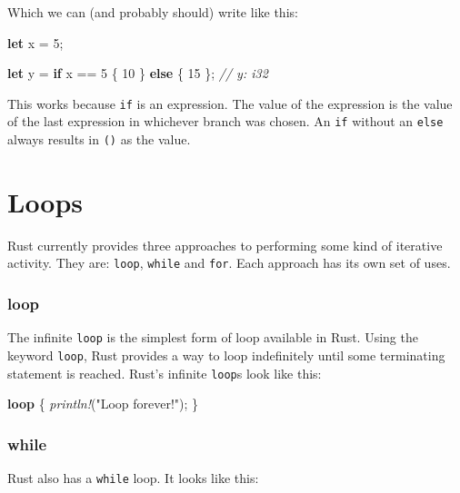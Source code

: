 \documentclass[a4paper,]{book}
\newenvironment{Shaded}{\begin{snugshade}}{\end{snugshade}}
\newcommand{\KeywordTok}[1]{\textcolor[rgb]{0.13,0.29,0.53}{\textbf{{#1}}}}
\newcommand{\DecValTok}[1]{\textcolor[rgb]{0.00,0.00,0.81}{{#1}}}
\newcommand{\StringTok}[1]{\textcolor[rgb]{0.31,0.60,0.02}{{#1}}}
\newcommand{\CommentTok}[1]{\textcolor[rgb]{0.56,0.35,0.01}{\textit{{#1}}}}
\newcommand{\PreprocessorTok}[1]{\textcolor[rgb]{0.56,0.35,0.01}{\textit{{#1}}}}
\newcommand{\NormalTok}[1]{{#1}}
\begin{document}
Which we can (and probably should) write like this:

\begin{Shaded}
\begin{Highlighting}[]
\KeywordTok{let} \NormalTok{x = }\DecValTok{5}\NormalTok{;}

\KeywordTok{let} \NormalTok{y = }\KeywordTok{if} \NormalTok{x == }\DecValTok{5} \NormalTok{\{ }\DecValTok{10} \NormalTok{\} }\KeywordTok{else} \NormalTok{\{ }\DecValTok{15} \NormalTok{\}; }\CommentTok{// y: i32}
\end{Highlighting}
\end{Shaded}

This works because \texttt{if} is an expression. The value of the
expression is the value of the last expression in whichever branch was
chosen. An \texttt{if} without an \texttt{else} always results in
\texttt{()} as the value.

\section{Loops}\label{sec--loops}

Rust currently provides three approaches to performing some kind of
iterative activity. They are: \texttt{loop}, \texttt{while} and
\texttt{for}. Each approach has its own set of uses.

\subsubsection{loop}\label{loop}

The infinite \texttt{loop} is the simplest form of loop available in
Rust. Using the keyword \texttt{loop}, Rust provides a way to loop
indefinitely until some terminating statement is reached. Rust's
infinite \texttt{loop}s look like this:

\begin{Shaded}
\begin{Highlighting}[]
\KeywordTok{loop} \NormalTok{\{}
    \PreprocessorTok{println!}\NormalTok{(}\StringTok{"Loop forever!"}\NormalTok{);}
\NormalTok{\}}
\end{Highlighting}
\end{Shaded}

\subsubsection{while}\label{while}

Rust also has a \texttt{while} loop. It looks like this:
\end{document}
